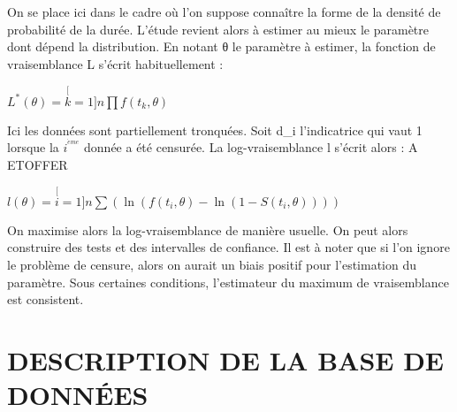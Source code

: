 \documentclass[12pt,a4paper]{article}
\begin{document}

On se place ici dans le cadre où l’on suppose connaître la forme de la densité de probabilité de la durée. L’étude revient alors à estimer au mieux le paramètre dont dépend la distribution. En notant θ le paramètre à estimer, la fonction de vraisemblance L s’écrit habituellement : 

$L^{*}\left(\theta\right)=\stackrel[k=1]{n}{\prod}f\left(t_{k},\theta\right)$
 

Ici les données sont partiellement tronquées. Soit d_{i}
  l’indicatrice qui vaut 1 lorsque la $i^{^{\grave{e}me}}$
  donnée a été censurée. La log-vraisemblance l s’écrit alors : A ETOFFER

$l\left(\theta\right)=\stackrel[i=1]{n}{\sum}\left(\ln\left(f\left(t_{i},\theta\right)-\ln\left(1-S\left(t_{i},\theta\right)\right)\right)\right)$
 

On maximise alors la log-vraisemblance de manière usuelle. On peut alors construire des tests et des intervalles de confiance. Il est à noter que si l’on ignore le problème de censure, alors on aurait un biais positif pour l’estimation du paramètre. Sous certaines conditions, l’estimateur du maximum de vraisemblance est consistent.

\section{DESCRIPTION DE LA BASE DE DONN\'EES}
\end{document}
